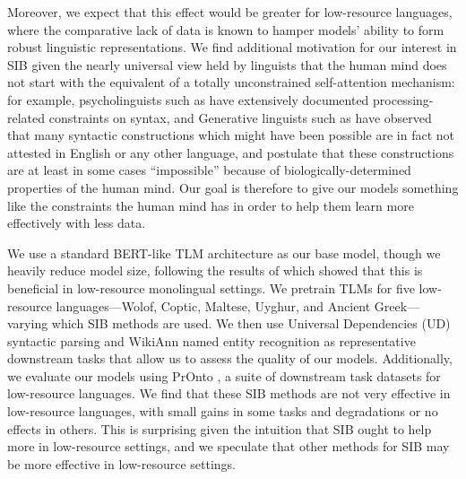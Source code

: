 \documentclass[11pt]{article}
\begin{document}
Moreover, we expect that this effect would be greater for low-resource languages, where the comparative lack of data is known to hamper models' ability to form robust linguistic representations.
We find additional motivation for our interest in SIB given the nearly universal view held by linguists that the human mind does not start with the equivalent of a totally unconstrained self-attention mechanism: for example, psycholinguists such as \citet{hawkins_cross-linguistic_2014} have extensively documented processing-related constraints on syntax, and Generative linguists such as \citet{ross_constraints_1967} have observed that many syntactic constructions which might have been possible are in fact not attested in English or any other language, and postulate that these constructions are at least in some cases ``impossible'' because of biologically-determined properties of the human mind.
Our goal is therefore to give our models something like the constraints the human mind has in order to help them learn more effectively with less data.


We use a standard BERT-like TLM architecture as our base model, though we heavily reduce model size, following the results of \citet{gessler-zeldes-2022-microbert} which showed that this is beneficial in low-resource monolingual settings.
We pretrain TLMs for five low-resource languages---Wolof, Coptic, Maltese, Uyghur, and Ancient Greek---varying which SIB methods are used.
We then use Universal Dependencies (UD) \citep{nivre_universal_2016} syntactic parsing and WikiAnn \citep{pan-etal-2017-cross} named entity recognition as representative downstream tasks that allow us to assess the quality of our models.
Additionally, we evaluate our models using PrOnto \citep{gessler2023pronto}, a suite of downstream task datasets for low-resource languages.
We find that these SIB methods are not very effective in low-resource languages, with small gains in some tasks and degradations or no effects in others. 
This is surprising given the intuition that SIB ought to help more in low-resource settings, and we speculate that other methods for SIB may be more effective in low-resource settings.
\end{document}
